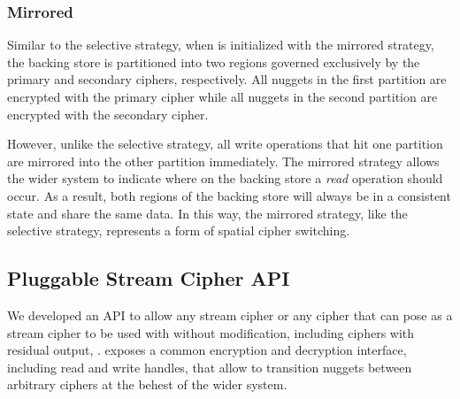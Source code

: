 \subsubsection{Mirrored}

Similar to the selective strategy, when \SYSTEM{} is initialized with the
mirrored strategy, the backing store is partitioned into two regions governed
exclusively by the primary and secondary ciphers, respectively. All nuggets in
the first partition are encrypted with the primary cipher while all nuggets in
the second partition are encrypted with the secondary cipher.

However, unlike the selective strategy, all write operations that hit one
partition are mirrored into the other partition immediately. The mirrored
strategy allows the wider system to indicate where on the backing store a
\emph{read} operation should occur. As a result, both regions of the backing
store will always be in a consistent state and share the same data. In this way,
the mirrored strategy, like the selective strategy, represents a form of spatial
cipher switching.

\subsection{Pluggable Stream Cipher API}

 We developed an API to allow any stream cipher or any
cipher that can pose as a stream cipher to be used with \SYSTEM{} without
modification, including ciphers with residual output, .  \SYSTEM{} exposes a common encryption and decryption interface,
including read and write handles, that allow \SYSTEM{} to transition nuggets
between arbitrary ciphers at the behest of the wider system. 

